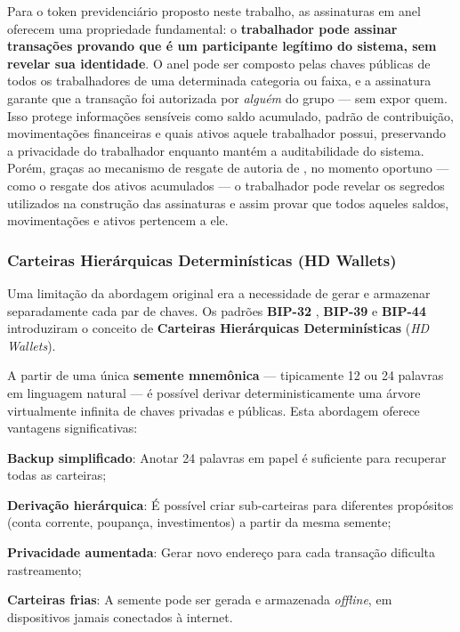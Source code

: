 Para o token previdenciário proposto neste trabalho, as assinaturas em anel oferecem uma propriedade fundamental: o \textbf{trabalhador pode assinar transações provando que é um participante legítimo do sistema, sem revelar sua identidade}. O anel pode ser composto pelas chaves públicas de todos os trabalhadores de uma determinada categoria ou faixa, e a assinatura garante que a transação foi autorizada por \textit{alguém} do grupo --- sem expor quem. Isso protege informações sensíveis como saldo acumulado, padrão de contribuição, movimentações financeiras e quais ativos aquele trabalhador possui, preservando a privacidade do trabalhador enquanto mantém a auditabilidade do sistema. Porém, graças ao mecanismo de resgate de autoria de , no momento oportuno --- como o resgate dos ativos acumulados --- o trabalhador pode revelar os segredos utilizados na construção das assinaturas e assim provar que todos aqueles saldos, movimentações e ativos pertencem a ele.

\subsubsection{Carteiras Hierárquicas Determinísticas (HD Wallets)}

Uma limitação da abordagem original era a necessidade de gerar e armazenar separadamente cada par de chaves. Os padrões \textbf{BIP-32} \cite{bip32}, \textbf{BIP-39} \cite{bip39} e \textbf{BIP-44} introduziram o conceito de \textbf{Carteiras Hierárquicas Determinísticas} (\textit{HD Wallets}).

A partir de uma única \textbf{semente mnemônica} --- tipicamente 12 ou 24 palavras em linguagem natural --- é possível derivar deterministicamente uma árvore virtualmente infinita de chaves privadas e públicas. Esta abordagem oferece vantagens significativas:

\begin{alineas}
    \item \textbf{Backup simplificado}: Anotar 24 palavras em papel é suficiente para recuperar todas as carteiras;
    \item \textbf{Derivação hierárquica}: É possível criar sub-carteiras para diferentes propósitos (conta corrente, poupança, investimentos) a partir da mesma semente;
    \item \textbf{Privacidade aumentada}: Gerar novo endereço para cada transação dificulta rastreamento;
    \item \textbf{Carteiras frias}: A semente pode ser gerada e armazenada \textit{offline}, em dispositivos jamais conectados à internet.
\end{alineas}

